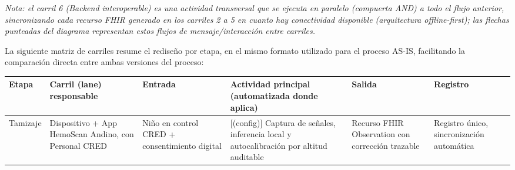 \documentclass[11pt,a4paper]{article}
\begin{document}
\emph{Nota: el carril 6 (Backend interoperable) es una actividad transversal que se ejecuta en paralelo (compuerta AND) a todo el flujo anterior, sincronizando cada recurso FHIR generado en los carriles 2 a 5 en cuanto hay conectividad disponible (arquitectura offline-first); las flechas punteadas del diagrama representan estos flujos de mensaje/interacción entre carriles.}

La siguiente matriz de carriles resume el rediseño por etapa, en el mismo formato utilizado para el proceso AS-IS, facilitando la comparación directa entre ambas versiones del proceso:

{\small
\begin{longtable}[]{@{}
  >{\raggedright\arraybackslash}p{}
  >{\raggedright\arraybackslash}p{}
  >{\raggedright\arraybackslash}p{}
  >{\raggedright\arraybackslash}p{}
  >{\raggedright\arraybackslash}p{}
  >{\raggedright\arraybackslash}p{}@{}}
\toprule\noalign{}
\begin{minipage}[b]{\linewidth}\raggedright
Etapa
\end{minipage} & \begin{minipage}[b]{\linewidth}\raggedright
Carril (lane) responsable
\end{minipage} & \begin{minipage}[b]{\linewidth}\raggedright
Entrada
\end{minipage} & \begin{minipage}[b]{\linewidth}\raggedright
Actividad principal (automatizada donde aplica)
\end{minipage} & \begin{minipage}[b]{\linewidth}\raggedright
Salida
\end{minipage} & \begin{minipage}[b]{\linewidth}\raggedright
Registro
\end{minipage} \\
\midrule\noalign{}
\endhead
\bottomrule\noalign{}
\endlastfoot
Tamizaje & Dispositivo + App HemoScan Andino, con Personal CRED & Niño en control CRED + consentimiento digital & {[}(config){]} Captura de señales, inferencia local y autocalibración por altitud auditable & Recurso FHIR Observation con corrección trazable & Registro único, sincronización automática \\

\end{longtable}}
\end{document}
